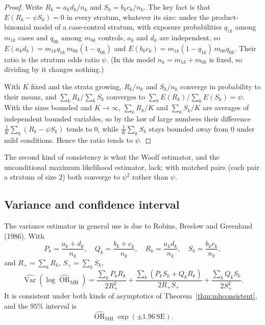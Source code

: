 \documentclass[11pt,a4paper]{article}
\numberwithin{equation}{section}
\DeclareMathOperator{\Var}{Var}
\DeclareMathOperator{\OR}{OR}
\theoremstyle{definition}
\begin{document}
\begin{proof}
Write $R_k = a_k d_k/n_k$ and $S_k = b_k c_k/n_k$. The key fact is that $E(R_k - \psi S_k) = 0$ in every stratum, whatever its size: under the
product-binomial model of a case-control stratum, with exposure probabilities $q_{1k}$ among $m_{1k}$ cases and $q_{0k}$ among $m_{0k}$ controls, $a_k$ and $d_k$ are
independent, so $E(a_k d_k) = m_{1k}q_{1k}\,m_{0k}(1 - q_{0k})$ and $E(b_k c_k) = m_{1k}(1 - q_{1k})\,m_{0k}q_{0k}$. Their ratio is the stratum odds ratio $\psi$. (In this
model $n_k = m_{1k} + m_{0k}$ is fixed, so dividing by it changes nothing.)

With $K$ fixed and the strata growing, $R_k/n_k$ and $S_k/n_k$ converge in probability to their means, and $\sum_k R_k/\sum_k S_k$ converges to
$\sum_k E(R_k)/\sum_k E(S_k) = \psi$. With the sizes bounded and $K \to \infty$, $\sum_k R_k/K$ and $\sum_k S_k/K$ are averages of independent bounded variables, so by
the law of large numbers their difference $\frac1K\sum_k (R_k - \psi S_k)$ tends to $0$, while $\frac1K\sum_k S_k$ stays bounded away from $0$ under mild conditions.
Hence the ratio tends to $\psi$.
\end{proof}

The second kind of consistency is what the Woolf estimator, and the unconditional maximum likelihood estimator, lack: with matched pairs
(each pair a stratum of size $2$) both converge to $\psi^2$ rather than $\psi$.

\subsection{Variance and confidence interval}

The variance estimator in general use is due to Robins, Breslow and Greenland (1986). With
\[
P_k = \frac{a_k + d_k}{n_k}, \quad Q_k = \frac{b_k + c_k}{n_k}, \quad R_k = \frac{a_k d_k}{n_k}, \quad S_k = \frac{b_k c_k}{n_k} ,
\]
and $R_+ = \sum_k R_k$, $S_+ = \sum_k S_k$,
\[
\widehat{\Var}(\log\widehat{\OR}_{\text{MH}}) = \frac{\sum_k P_k R_k}{2R_+^2} + \frac{\sum_k (P_k S_k + Q_k R_k)}{2R_+ S_+} + \frac{\sum_k Q_k S_k}{2S_+^2} .
\]
It is consistent under both kinds of asymptotics of Theorem~\ref{thm:mhconsistent}, and the $95\%$ interval is
\[
\widehat{\OR}_{\text{MH}}\exp(\pm 1.96\,\text{SE}) .
\]
\end{document}
